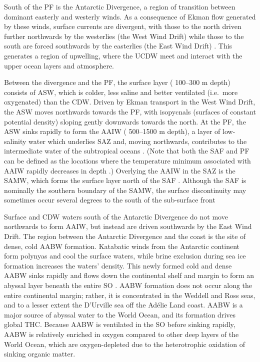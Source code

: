 South of the \ac{PF} is the Antarctic Divergence, a region of transition between dominant easterly and westerly winds.
As a consequence of Ekman flow generated by these winds, surface currents are divergent, with those to the north driven further northwards by the westerlies (the West Wind Drift) while those to the south are forced southwards by the easterlies (the East Wind Drift) \cite{Foldvik:1988gp}.
This generates a region of upwelling, where the \ac{UCDW} meet and interact with the upper ocean layers and atmosphere.

Between the divergence and the \ac{PF}, the surface layer (\textapprox{} 100--300 m depth) consists of \ac{ASW}, which is colder, less saline and better ventilated (i.e.\ more oxygenated) than the \ac{CDW}.
Driven by Ekman transport in the West Wind Drift, the \ac{ASW} moves northwards towards the \ac{PF}, with isopycnals (surfaces of constant potential density) sloping gently downwards towards the north.
At the \ac{PF}, the \ac{ASW} sinks rapidly to form the \ac{AAIW} (\textapprox{} 500--1500 m depth), a layer of low-salinity water which underlies \ac{SAZ} and, moving northwards, contributes to the intermediate water of the subtropical oceans \cite{Foldvik:1988gp}.
(Note that both the \ac{SAF} and \ac{PF} can be defined as the locations where the temperature minimum associated with \ac{AAIW} rapidly decreases in depth \cite{WhitworthIII:1987ky}.)
Overlying the \ac{AAIW} in the \ac{SAZ} is the \ac{SAMW}, which forms the surface layer north of the \ac{SAF} \cite{Speer:2000th}.
Although the \ac{SAF} is nominally the southern boundary of the \ac{SAMW}, the surface discontinuity may sometimes occur several degrees to the south of the sub-surface front \citep[e.g.][]{Deacon:1982ce,Orsi:1995va}

Surface and \ac{CDW} waters south of the Antarctic Divergence do not move northwards to form \ac{AAIW}, but instead are driven southwards by the East Wind Drift.
The region between the Antarctic Divergence and the coast is the site of dense, cold \ac{AABW} formation.
Katabatic winds from the Antarctic continent form polynyas and cool the surface waters, while brine exclusion during sea ice formation increases the waters' density.
This newly formed cold and dense \ac{AABW} sinks rapidly and flows down the continental shelf and margin to form an abyssal layer beneath the entire \ac{SO} \cite{Orsi:1999hz,Foldvik:1988gp}.
\ac{AABW} formation does not occur along the entire continental margin; rather, it is concentrated in the Weddell and Ross seas, and to a lesser extent the D'Urville sea off the Ad\'{e}lie Land coast.
\ac{AABW} is a major source of abyssal water to the World Ocean, and its formation drives global \ac{THC}.
Because \ac{AABW} is ventilated in the \ac{SO} before sinking rapidly, \ac{AABW} is relatively enriched in oxygen compared to other deep layers of the World Ocean, which are oxygen-depleted due to the heterotrophic oxidation of sinking organic matter.

